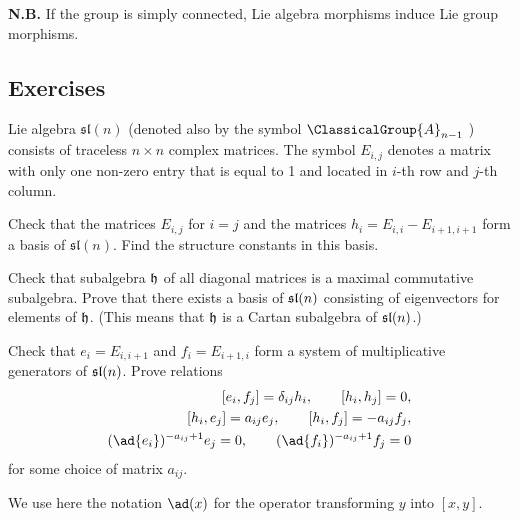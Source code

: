 \medbreak\noindent\textbf{N.B.} If the group is simply connected,
Lie algebra morphisms induce Lie group morphisms.

\subsection{Exercises}

Lie algebra $\mathfrak{sl}(n)$ (denoted also by the symbol $\ClassicalGroup{A}_{n-1}$ ) consists of traceless $n\times n$ complex matrices. The symbol $E_{i,j}$ denotes a matrix with only one non-zero entry that is equal to 1 and located in $i$-th row and $j$-th column.
\begin{exercise}
Check that the matrices $E_{i,j}$ for $i = j$ and the matrices $h_{i} = E_{i,i} - E_{i+1,i+1}$ form a
basis of $\mathfrak{sl}(n)$. Find the structure constants in this basis.
\end{exercise}
\begin{exercise}
Check that subalgebra $\frak{h}$ of all diagonal matrices is a maximal
commutative subalgebra. Prove that there exists a basis of $\frak{sl}(n)$
consisting of eigenvectors for elements of $\frak{h}$. (This means
that $\frak{h}$ is a Cartan subalgebra of $\frak{sl}(n)$.)
\end{exercise}
\begin{exercise}
Check that $e_{i} = E_{i,i+1}$ and $f_{i} = E_{i+1,i}$ form a system of multiplicative generators of
$\frak{sl}(n)$. Prove relations
\begin{subequations}
\begin{align}
  [e_{i} , f_{j} ] = \delta_{ij} h_{i},\qquad [h_{i} , h_{j} ] = 0,\\
  [h_{i} , e_{j} ] = a_{ij} e_{j} ,\qquad [h_{i} , f_{j} ] = -a_{ij} f_{j},\\
  (\ad{e_{i}} )^{-a_{ij} +1} e_{j} = 0,\qquad (\ad{f_{i}} )^{-a_{ij} +1} f_{j} = 0
\end{align}
\end{subequations}
for some choice of matrix $a_{ij}$.

 We use here the notation $\ad(x)$ for the operator transforming $y$ into $[x, y]$.
\end{exercise}

